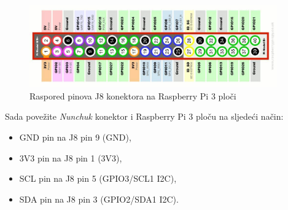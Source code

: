 \documentclass[11pt]{article}
\begin{document}
\begin{figure}[h!]
\centering
\includegraphics[width=0.95\textwidth]{j8-rpi.jpg}
\captionsetup{justification=centering}
\caption{Raspored pinova J8 konektora na Raspberry Pi 3 ploči}
\end{figure}
\newpage
Sada povežite \textit{Nunchuk} konektor i Raspberry Pi 3 ploču na sljedeći način:
\begin{itemize}
	\item GND pin na J8 pin 9 (GND),
	\item 3V3 pin na J8 pin 1 (3V3),
	\item SCL pin na J8 pin 5 (GPIO3/SCL1 I2C),
	\item SDA pin na J8 pin 3 (GPIO2/SDA1 I2C).
\end{itemize}
\end{document}
